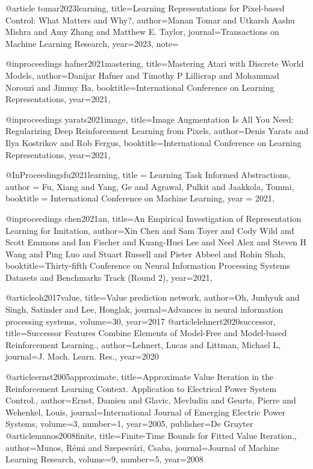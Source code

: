 @article{
tomar2023learning,
title={Learning Representations for Pixel-based Control: What Matters and Why?},
author={Manan Tomar and Utkarsh Aashu Mishra and Amy Zhang and Matthew E. Taylor},
journal={Transactions on Machine Learning Research},
year={2023},
note={}
}

@inproceedings{
hafner2021mastering,
title={Mastering Atari with Discrete World Models},
author={Danijar Hafner and Timothy P Lillicrap and Mohammad Norouzi and Jimmy Ba},
booktitle={International Conference on Learning Representations},
year={2021},
}

@inproceedings{
yarats2021image,
title={Image Augmentation Is All You Need: Regularizing Deep Reinforcement Learning from Pixels},
author={Denis Yarats and Ilya Kostrikov and Rob Fergus},
booktitle={International Conference on Learning Representations},
year={2021},
}


@InProceedings{fu2021learning,
  title = 	 {Learning Task Informed Abstractions},
  author =       {Fu, Xiang and Yang, Ge and Agrawal, Pulkit and Jaakkola, Tommi},
  booktitle = 	 {International Conference on Machine Learning},
  year = 	 {2021},
}

@inproceedings{
chen2021an,
title={An Empirical Investigation of Representation Learning for Imitation},
author={Xin Chen and Sam Toyer and Cody Wild and Scott Emmons and Ian Fischer and Kuang-Huei Lee and Neel Alex and Steven H Wang and Ping Luo and Stuart Russell and Pieter Abbeel and Rohin Shah},
booktitle={Thirty-fifth Conference on Neural Information Processing Systems Datasets and Benchmarks Track (Round 2)},
year={2021},
}

@article{oh2017value,
  title={Value prediction network},
  author={Oh, Junhyuk and Singh, Satinder and Lee, Honglak},
  journal={Advances in neural information processing systems},
  volume={30},
  year={2017}
}
@article{lehnert2020successor,
  title={Successor Features Combine Elements of Model-Free and Model-based Reinforcement Learning.},
  author={Lehnert, Lucas and Littman, Michael L},
  journal={J. Mach. Learn. Res.},
  year={2020}
}

@article{ernst2005approximate,
  title={Approximate Value Iteration in the Reinforcement Learning Context. Application to Electrical Power System Control.},
  author={Ernst, Damien and Glavic, Mevludin and Geurts, Pierre and Wehenkel, Louis},
  journal={International Journal of Emerging Electric Power Systems},
  volume={3},
  number={1},
  year={2005},
  publisher={De Gruyter}
}
@article{munos2008finite,
  title={Finite-Time Bounds for Fitted Value Iteration.},
  author={Munos, R{\'e}mi and Szepesv{\'a}ri, Csaba},
  journal={Journal of Machine Learning Research},
  volume={9},
  number={5},
  year={2008}
}

